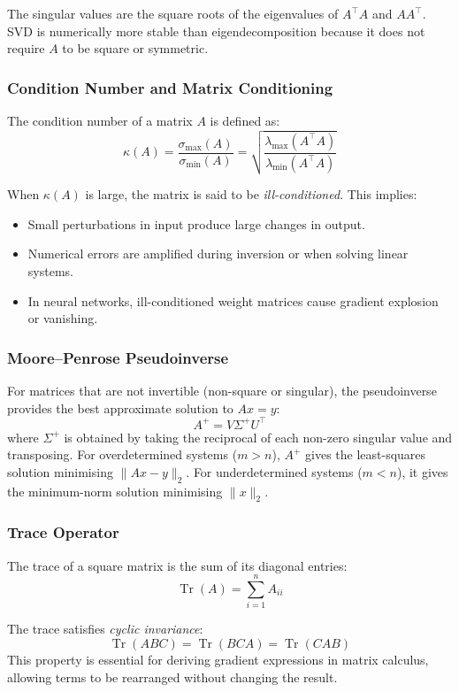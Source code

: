 \documentclass[11pt]{article}
\begin{document}
The singular values are the square roots of the eigenvalues of $A^\top A$ and $AA^\top$. SVD is numerically more stable than eigendecomposition because it does not require $A$ to be square or symmetric.

\subsubsection{Condition Number and Matrix Conditioning}

The condition number of a matrix $A$ is defined as:
\[
    \kappa(A) = \frac{\sigma_{\max}(A)}{\sigma_{\min}(A)}
              = \sqrt{\frac{\lambda_{\max}(A^\top A)}{\lambda_{\min}(A^\top A)}}
\]

When $\kappa(A)$ is large, the matrix is said to be \emph{ill-conditioned}. This implies:
\begin{itemize}[leftmargin=2em]
    \item Small perturbations in input produce large changes in output.
    \item Numerical errors are amplified during inversion or when solving linear systems.
    \item In neural networks, ill-conditioned weight matrices cause gradient explosion or vanishing.
\end{itemize}

\subsubsection{Moore--Penrose Pseudoinverse}

For matrices that are not invertible (non-square or singular), the pseudoinverse provides the best approximate solution to $Ax = y$:
\[
    A^{+} = V \Sigma^{+} U^\top
\]
where $\Sigma^{+}$ is obtained by taking the reciprocal of each non-zero singular value and transposing. For overdetermined systems ($m > n$), $A^{+}$ gives the least-squares solution minimising $\|Ax - y\|_2$. For underdetermined systems ($m < n$), it gives the minimum-norm solution minimising $\|x\|_2$.

\subsubsection{Trace Operator}

The trace of a square matrix is the sum of its diagonal entries:
\[
    \operatorname{Tr}(A) = \sum_{i=1}^{n} A_{ii}
\]

The trace satisfies \emph{cyclic invariance}:
\[
    \operatorname{Tr}(ABC) = \operatorname{Tr}(BCA) = \operatorname{Tr}(CAB)
\]
This property is essential for deriving gradient expressions in matrix calculus, allowing terms to be rearranged without changing the result.
\end{document}
